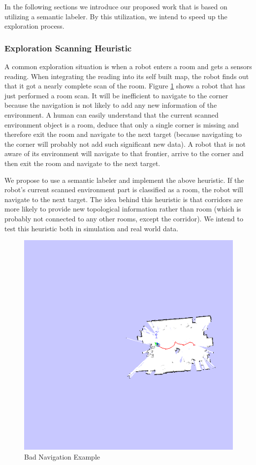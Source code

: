 \documentclass[a4paper,10pt]{article}
\begin{document}
In the following sections we introduce our proposed work that is based on
utilizing a semantic labeler. By this utilization, we intend to speed up the
exploration process.

  
\label{section:RoomDetection}

\subsubsection{Exploration Scanning Heuristic}
\label{section:ExplorationScanningHeuristic}
A common exploration situation is when a robot enters a room and gets a sensors
reading. When integrating the reading into its self built map, the robot
finds out that it got a nearly complete scan of the room. 
Figure \ref{fig:BadNavigation} shows a robot that has just performed a room scan. It will be
inefficient to navigate to the corner because the navigation is not likely to
add any new information of the environment.
A human can easily understand that the current scanned environment object is a
room, deduce that only a single corner is missing and therefore exit the room and navigate
to the next target (because navigating to the corner will probably not add such
significant new data). A robot that is not aware of its environment will
navigate to that frontier, arrive to the corner and then exit the room and
navigate to the next target.

We propose to use a semantic labeler and implement the above heuristic.
If the robot's current scanned environment part is classified as a room, 
the robot will navigate to the next target. The idea behind this heuristic is
that corridors are more likely to provide new topological information rather
than room (which is probably not connected to any other rooms, except the
corridor). We intend to test this heuristic both in simulation and real world
data.

\begin{figure}[htb]
 \centering
 \includegraphics[width=0.5\columnwidth,keepaspectratio]{images/BadNavigation.png}
 \caption{Bad Navigation Example}
 \label{fig:BadNavigation}
\end{figure}
\end{document}
